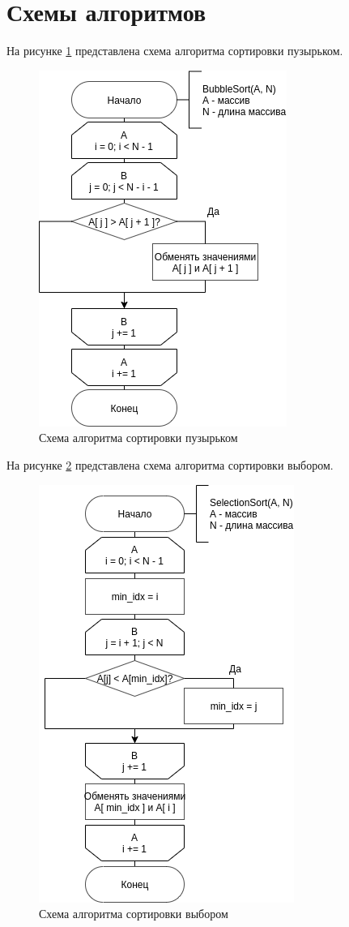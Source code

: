 \section{Схемы алгоритмов}

На рисунке \ref{scheme:bubble} представлена схема алгоритма сортировки пузырьком.
\begin{figure}[!htb]
	\centering
	\includegraphics[scale=0.56]{schemes/bubble}
	\caption{Схема алгоритма сортировки пузырьком}
	\label{scheme:bubble}
\end{figure}

На рисунке \ref{scheme:select} представлена схема алгоритма сортировки выбором.
\begin{figure}[!htb]
	\centering
	\includegraphics[scale=0.56]{schemes/select}
	\caption{Схема алгоритма сортировки выбором}
	\label{scheme:select}
\end{figure}

